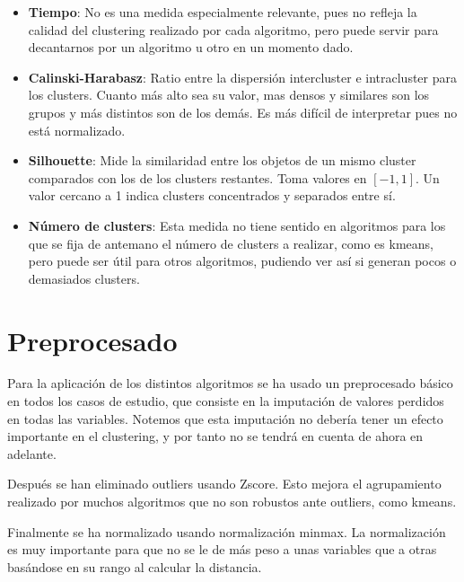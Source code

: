 \begin{itemize}
\item \textbf{Tiempo}: No es una medida especialmente relevante, pues no refleja la calidad del clustering realizado por cada algoritmo, pero puede servir para decantarnos por un algoritmo u otro en un momento dado.
\item \textbf{Calinski-Harabasz}: Ratio entre la dispersión intercluster e intracluster para los clusters. Cuanto más alto sea su valor, mas densos y similares son los grupos y más distintos son de los demás. Es más difícil de interpretar pues no está normalizado.
\item \textbf{Silhouette}: Mide la similaridad entre los objetos de un mismo cluster comparados con los de los clusters restantes. Toma valores en $[-1, 1]$. Un valor cercano a 1 indica clusters concentrados y separados entre sí.
\item \textbf{Número de clusters}: Esta medida no tiene sentido en algoritmos para los que se fija de antemano el número de clusters a realizar, como es kmeans, pero puede ser útil para otros algoritmos, pudiendo ver así si generan pocos o demasiados clusters.  
\end{itemize}

\section{Preprocesado}

Para la aplicación de los distintos algoritmos se ha usado un preprocesado básico en todos los casos de estudio, que consiste en la imputación de valores perdidos en todas las variables. Notemos que esta imputación no debería tener un efecto importante en el clustering, y por tanto no se tendrá en cuenta de ahora en adelante.

Después se han eliminado outliers usando Zscore. Esto mejora el agrupamiento realizado por muchos algoritmos que no son robustos ante outliers, como kmeans.

Finalmente se ha normalizado usando normalización minmax. La normalización es muy importante para que no se le de más peso a unas variables que a otras basándose en su rango al calcular la distancia.



